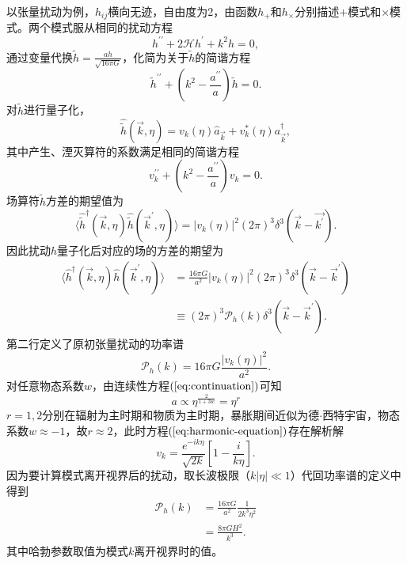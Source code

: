 以张量扰动为例，$h_{ij}$横向无迹，自由度为2，由函数$h_{+}$和$h_{\times}$分别描述$+$模式和$\times$模式。两个模式服从相同的扰动方程
\begin{equation}
  \label{eq:tensor-perturbation-equation}
  h^{\prime\prime}+ 2\mathcal{H}h^\prime+k^2h = 0,
\end{equation}
通过变量代换$\tilde{h}=\frac{ah}{\sqrt{16\pi G}}$，化简为关于$\tilde{h}$的简谐方程
\begin{equation}
  \tilde{h}^{\prime\prime}+(k^2-\frac{a^{\prime\prime}}{a})\tilde{h} =0. 
\end{equation}
对$\tilde{h}$进行量子化，
\begin{equation}
  \hat{\tilde{h}}(\vec{k},\eta)=v_k(\eta)\hat{a}_{\vec{k}}+v^{*}_k(
  \eta)a^{\dagger}_{\vec{k}},
\end{equation}
其中产生、湮灭算符的系数满足相同的简谐方程
\begin{equation}
  \label{eq:harmonic-equation}
  v_k^{\prime\prime}+(k^2-\frac{a^{\prime\prime}}{a})v_k =0. 
\end{equation}
场算符$\tilde{h}$方差的期望值为
\begin{equation}
  \langle \hat{\tilde{h}}^{\dagger}(\vec{k},
  \eta)\hat{\tilde{h}}(\vec{k}^{\prime},\eta)\rangle={\lvert
  v_k(\eta)\rvert}^2 {\left(2\pi
\right)}^3\delta^{3}(\vec{k}-\vec{k^\prime}).
\end{equation}
因此扰动$h$量子化后对应的场的方差的期望为
\begin{align}
  \langle \hat{h}^{\dagger}(\vec{k},\eta)\hat{h}(\vec{k}^{\prime},\eta) \rangle
  &= \frac{16\pi G}{a^2}{\lvert
  v_k(\eta)\rvert}^2{\left(2\pi\right)}^3\delta^3(\vec{k}-\vec{k}^{\prime})
  \\
  &\equiv {\left(2\pi\right)}^3 \mathcal{P}_h(k)\delta^3(\vec{k}-\vec{k}^\prime).
\end{align}
第二行定义了原初张量扰动的功率谱
\begin{equation}
  \label{eq:tensor-primodial-pertubation} 
  \mathcal{P}_h(k) = 16\pi G \frac{{\lvert v_k(\eta)\rvert}^2}{a^2}.
\end{equation}
对任意物态系数$w$，由连续性方程$(\ref{eq:continuation})$可知
\begin{equation}
  a \propto \eta^{\frac{2}{1+3w}} = \eta^{r} 
\end{equation}
$r=1,2$分别在辐射为主时期和物质为主时期，暴胀期间近似为德$\cdot$西特宇宙，物态系数$w\approx
-1$，故$r\approx 2$，此时方程$(\ref{eq:harmonic-equation})$存在解析解
\begin{equation}
  \label{eq:solution-for-harmonic-equation}
  v_k = \frac{e^{-ik\eta}}{\sqrt{2k}}{\left[1-\frac{i}{k\eta}\right]}.
\end{equation}
因为要计算模式离开视界后的扰动，取长波极限（$k\lvert \eta\rvert \ll
1$）代回功率谱的定义中得到
\begin{align}
  \label{eq:tensor-power-spectrum}
  \mathcal{P}_h(k)&= \frac{16\pi G}{a^2}\frac{1}{2k^3\eta^2} \\
        &= \frac{8\pi GH^2}{k^3}.
\end{align}
其中哈勃参数取值为模式$k$离开视界时的值。

